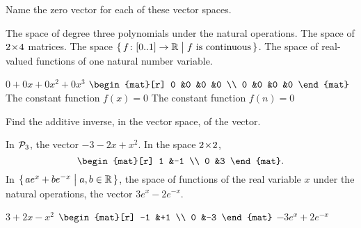 \begin{exercises}
  \item 
    Name the zero vector for each of these vector spaces.
    \begin{exparts}
      \partsitem The space of degree three polynomials under the natural
        operations.
      \partsitem The space of \( 2 \! \times \! 4 \) matrices.
      \partsitem The space
        \( \mbox{$\{\,\mbox{$f\colon [0..1]\to \mathbb{R}$}\bigm| f\text{ is continuous}\,\}$} \).
      \partsitem The space of real-valued functions of one natural 
        number variable.
    \end{exparts}
    \begin{answer}
      \begin{exparts}
        \partsitem \( 0+0x+0x^2+0x^3 \)
        \partsitem \( \begin{mat}[r]
                   0  &0  &0  &0  \\
                   0  &0  &0  &0
                 \end{mat} \)
        \partsitem The constant function \( f(x)=0 \)
        \partsitem The constant function \( f(n)=0 \)
      \end{exparts}  
    \end{answer}
  \recommended \item
    Find the additive inverse, in the vector space,
    of the vector.
    \begin{exparts}
      \partsitem In \( \mathcal{P}_3 \), the vector \( -3-2x+x^2 \).
      \partsitem In the space \( 2 \! \times \! 2 \),
        \begin{equation*}
          \begin{mat}[r]
            1  &-1  \\
            0  &3
          \end{mat}.
        \end{equation*}
     \partsitem In \( \mbox{$\{\,ae^x+be^{-x}\bigm| a,b\in\mathbb{R}\,\}$} \), the space 
       of functions of the real variable \( x \) under the natural operations,
       the vector \( 3e^x-2e^{-x} \).
    \end{exparts}
    \begin{answer}
      \begin{exparts*}
        \partsitem \( 3+2x-x^2 \)
        \partsitem \( \begin{mat}[r]
                   -1  &+1  \\
                    0  &-3
                 \end{mat} \)
        \partsitem \( -3e^x+2e^{-x} \)

\end{exparts*}
\end{answer}
\end{exercises}
